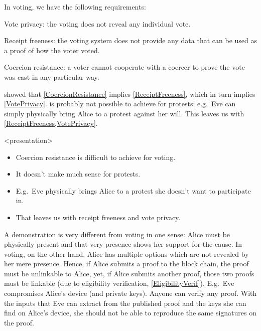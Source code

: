 In voting, we have the following requirements:
\begin{frame}
\begin{requirements}[P]
\item\label{VotePrivacy} Vote privacy: the voting does not reveal any 
  individual vote.
\item\label{ReceiptFreeness} Receipt freeness: the voting system does not 
  provide any data that can be used as a proof of how the voter voted.
\item\label{CoercionResistance} Coercion resistance: a voter cannot cooperate 
  with a coercer to prove the vote was cast in any particular way.
\end{requirements}
\pause
{}
\end{frame}
\Textcite{VerifyingPrivacyPropertiesOfVotingProtocols} showed that 
\cref{CoercionResistance} implies \cref{ReceiptFreeness}, which in turn implies
\cref{VotePrivacy}.
 is probably not possible to achieve for protests:
e.g.\ Eve can simply physically bring Alice to a protest against her will.
This leaves us with \cref{ReceiptFreeness,VotePrivacy}.

\begin{frame}<presentation>
  \begin{remark}
    \begin{itemize}
      \item Coercion resistance is difficult to achieve for voting.
      \item It doesn't make much sense for protests.
      \item E.g.\ Eve physically brings Alice to a protest she doesn't want to 
        participate in.
      \item That leaves us with receipt freeness and vote privacy.
    \end{itemize}
  \end{remark}
\end{frame}

A demonstration is very different from voting in one sense: Alice must be 
physically present and that very presence shows her support for the cause.
In voting, on the other hand, Alice has multiple options which are not revealed
by her mere presence.
Hence, if Alice submits a proof to the block chain, the proof must be 
unlinkable to Alice, yet, if Alice submits another proof, those two proofs must 
be linkable (due to eligibility verification, \cref{EligibilityVerif}).
E.g.\ Eve compromises Alice's device (and private keys).
Anyone can verify any proof.
With the inputs that Eve can extract from the published proof and the keys she 
can find on Alice's device, she should not be able to reproduce the same 
signatures on the proof.

